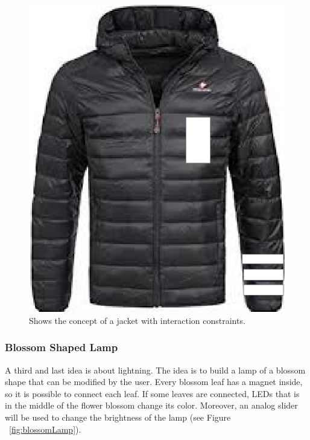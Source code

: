 \documentclass[04_projectProcess.tex]{subfiles}
\begin{document}
    \begin{figure}[h!]
        \centering
        \includegraphics[scale=0.2]{images/projectideas/jacket.png}
        \caption{Shows the concept of a jacket with interaction constraints.}
        \label{fig:jacketIdea}
    \end{figure}

    \subsubsection{Blossom Shaped Lamp}
    \label{BlossomShapedLamp}
    \begin{flushleft}
        A third and last idea is about lightning. The idea is to build a lamp of a blossom shape that 
        can be modified by the user. Every blossom leaf has a magnet inside, so it is possible to connect 
        each leaf. If some leaves are connected, LEDs that is in the middle of the flower blossom 
        change its color. Moreover, an analog slider will be used to change the brightness of the lamp 
        (see Figure ~\ref{fig:blossomLamp}).
    \end{flushleft}
\end{document}

